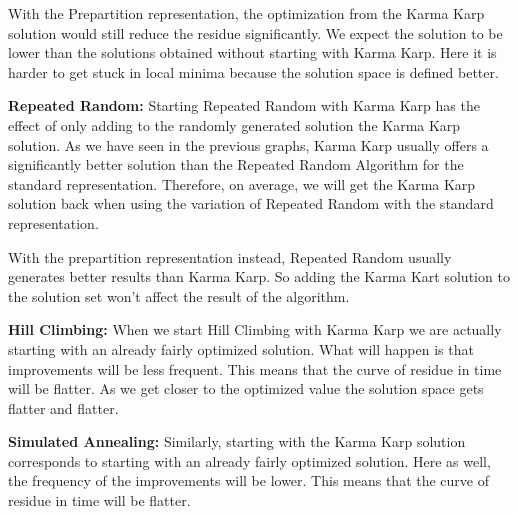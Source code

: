 \documentclass[11pt]{article}
\begin{document}
With the Prepartition representation, the optimization from the Karma Karp solution would still reduce the residue significantly. We expect the solution to be lower than the solutions obtained without starting with Karma Karp. Here it is harder to get stuck in local minima because the solution space is defined better. 



\textbf{Repeated Random:}
Starting Repeated Random with Karma Karp has the effect of only adding to the randomly generated solution the Karma Karp solution. As we have seen in the previous graphs, Karma Karp usually offers a significantly better solution than the Repeated Random Algorithm for the standard representation. Therefore, on average, we will get the Karma Karp solution back when using the variation of Repeated Random with the standard representation.

With the prepartition representation instead, Repeated Random usually generates better results than Karma Karp. So adding the Karma Kart solution to the solution set won't affect the result of the algorithm.



\textbf{Hill Climbing:}
When we start Hill Climbing with Karma Karp we are actually starting with an already fairly optimized solution. What will happen is that improvements will be less frequent. This means that the curve of residue in time will be flatter. As we get closer to the optimized value the solution space gets flatter and flatter. 


%



\textbf{Simulated Annealing:}
Similarly, starting with the Karma Karp solution corresponds to starting with an already fairly optimized solution. Here as well, the frequency of the improvements will be lower. This means that the curve of residue in time will be flatter. 


\clearpage
\end{document}
